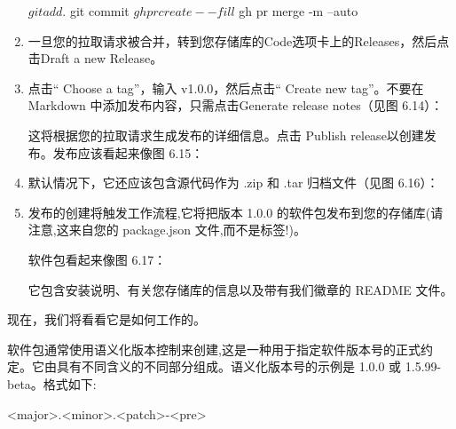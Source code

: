 \begin{enumerate}
\begin{shell}
$ git add .
$ git commit
$ gh pr create --fill
$ gh pr merge -m --auto
\end{shell}

\item 
一旦您的拉取请求被合并，转到您存储库的Code选项卡上的Releases，然后点击Draft a new Release。

\item 
点击“ Choose a tag”，输入 v1.0.0，然后点击“ Create new tag”。不要在 Markdown 中添加发布内容，只需点击Generate release notes（见图 6.14）：


这将根据您的拉取请求生成发布的详细信息。点击 Publish release以创建发布。发布应该看起来像图 6.15：


\item 
默认情况下，它还应该包含源代码作为 .zip 和 .tar 归档文件（见图 6.16）：


\item 
发布的创建将触发工作流程,它将把版本 1.0.0 的软件包发布到您的存储库(请注意,这来自您的 package.json 文件,而不是标签!)。

软件包看起来像图 6.17：


它包含安装说明、有关您存储库的信息以及带有我们徽章的 README 文件。

\end{enumerate}


现在，我们将看看它是如何工作的。


软件包通常使用语义化版本控制来创建,这是一种用于指定软件版本号的正式约定。它由具有不同含义的不同部分组成。语义化版本号的示例是 1.0.0 或 1.5.99-beta。格式如下:

\begin{shell}
<major>.<minor>.<patch>-<pre>
\end{shell}

